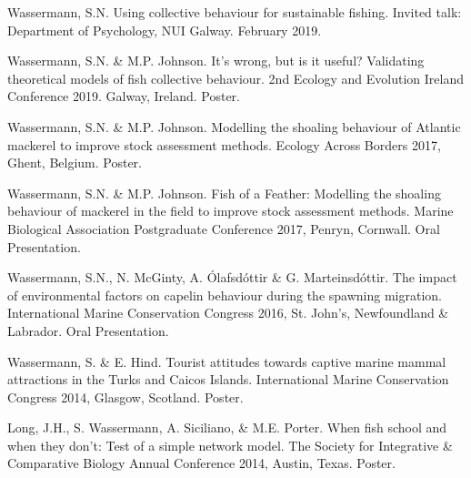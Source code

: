 \documentclass[a4paper]{deedy-resume} %
\begin{document}
\begin{flushleft}
\begin{tightitemize}
\item Wassermann, S.N. Using collective behaviour for sustainable fishing. Invited talk: Department of Psychology, NUI Galway. February 2019.
\item Wassermann, S.N. \& M.P. Johnson. It's wrong, but is it useful? Validating theoretical models of fish collective behaviour. 2nd Ecology and Evolution Ireland Conference 2019. Galway, Ireland. Poster.
\item Wassermann, S.N. \& M.P. Johnson. Modelling the shoaling behaviour of Atlantic mackerel to improve stock assessment methods. Ecology Across Borders 2017, Ghent, Belgium. Poster.
\item Wassermann, S.N. \& M.P. Johnson. Fish of a Feather: Modelling the shoaling behaviour of mackerel in the field to improve stock assessment methods. Marine Biological Association Postgraduate Conference 2017, Penryn, Cornwall. Oral Presentation.
\item Wassermann, S.N., N. McGinty, A. Ólafsdóttir \& G. Marteinsdóttir. The impact of environmental factors on capelin behaviour during the spawning migration. International Marine Conservation Congress 2016, St. John's, Newfoundland \& Labrador. Oral Presentation.
\item Wassermann, S. \& E. Hind. Tourist attitudes towards captive marine mammal attractions in the Turks and Caicos Islands. International Marine Conservation Congress 2014, Glasgow, Scotland. Poster.
\item Long, J.H., S. Wassermann, A. Siciliano, \& M.E. Porter. When fish school and when they don't: Test of a simple network model. The Society for Integrative \& Comparative Biology Annual Conference 2014, Austin, Texas. Poster.
\end{tightitemize}

\sectionspace


\end{flushleft}



\newpage %


\sectionspace
\end{document}

